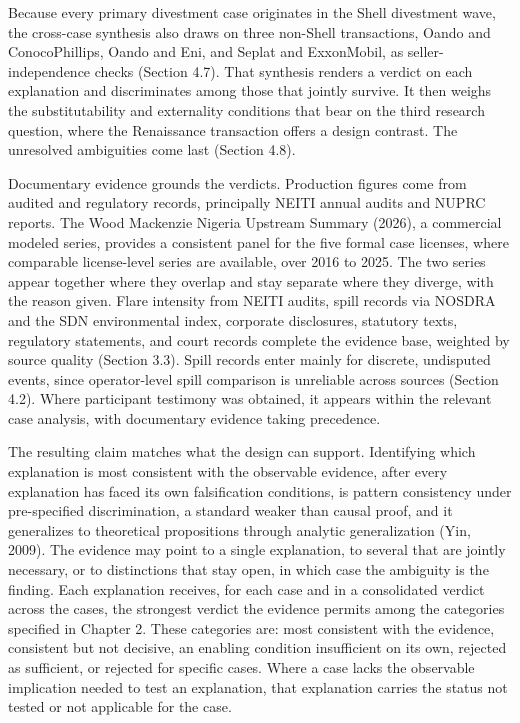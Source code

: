 Because every primary divestment case originates in the Shell divestment
wave, the cross-case synthesis also draws on three non-Shell
transactions, Oando and ConocoPhillips, Oando and Eni, and Seplat and
ExxonMobil, as seller-independence checks (Section 4.7). That synthesis
renders a verdict on each explanation and discriminates among those that
jointly survive. It then weighs the substitutability and externality
conditions that bear on the third research question, where the
Renaissance transaction offers a design contrast. The unresolved
ambiguities come last (Section 4.8).

Documentary evidence grounds the verdicts. Production figures come from
audited and regulatory records, principally NEITI annual audits and
NUPRC reports. The Wood Mackenzie Nigeria Upstream Summary (2026), a
commercial modeled series, provides a consistent panel for the five
formal case licenses, where comparable license-level series are
available, over 2016 to 2025. The two series appear together where they
overlap and stay separate where they diverge, with the reason given.
Flare intensity from NEITI audits, spill records via NOSDRA and the SDN
environmental index, corporate disclosures, statutory texts, regulatory
statements, and court records complete the evidence base, weighted by
source quality (Section 3.3). Spill records enter mainly for discrete,
undisputed events, since operator-level spill comparison is unreliable
across sources (Section 4.2). Where participant testimony was obtained,
it appears within the relevant case analysis, with documentary evidence
taking precedence.

The resulting claim matches what the design can support. Identifying
which explanation is most consistent with the observable evidence, after
every explanation has faced its own falsification conditions, is pattern
consistency under pre-specified discrimination, a standard weaker than
causal proof, and it generalizes to theoretical propositions through
analytic generalization (Yin, 2009). The evidence may point to a single
explanation, to several that are jointly necessary, or to distinctions
that stay open, in which case the ambiguity is the finding. Each
explanation receives, for each case and in a consolidated verdict across
the cases, the strongest verdict the evidence permits among the
categories specified in Chapter 2. These categories are: most consistent
with the evidence, consistent but not decisive, an enabling condition
insufficient on its own, rejected as sufficient, or rejected for
specific cases. Where a case lacks the observable implication needed to
test an explanation, that explanation carries the status not tested or
not applicable for the case.

